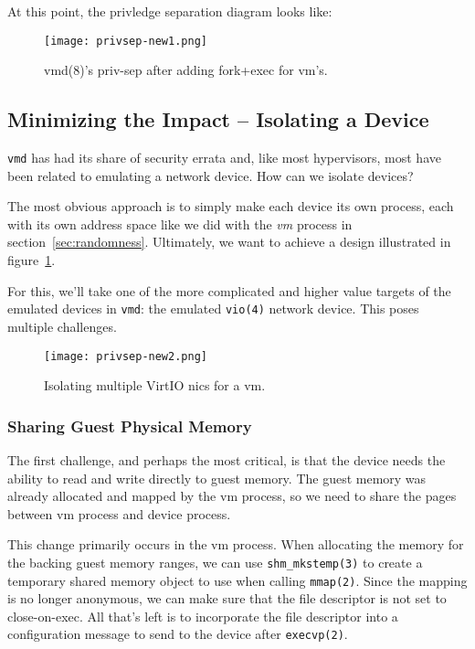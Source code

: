 \documentclass[conference]{IEEEtran}
\begin{document}
At this point, the privledge separation diagram looks like:

\begin{figure}
  \texttt{[image: privsep-new1.png]}
  \caption{vmd(8)'s priv-sep after adding fork+exec for vm's.}
\end{figure}


\vspace{3mm}
\subsection{Minimizing the Impact -- Isolating a Device}
\texttt{vmd} has had its share of security errata and, like most
hypervisors, most have been related to emulating a network device. How
can we isolate devices?

The most obvious approach is to simply make each device its own
process, each with its own address space like we did with the
\emph{vm} process in section~\ref{sec:randomness}. Ultimately, we want
to achieve a design illustrated in figure~\ref{fig:new2}.

For this, we'll take one of the more complicated and higher value
targets of the emulated devices in \texttt{vmd}: the emulated
\texttt{vio(4)} network device. This poses multiple challenges.

\begin{figure}
  \label{fig:new2}
  \texttt{[image: privsep-new2.png]}
  \caption{Isolating multiple VirtIO nics for a vm.}
\end{figure}


\vspace{2mm}
\subsubsection{Sharing Guest Physical Memory}
The first challenge, and perhaps the most critical, is that the device
needs the ability to read and write directly to guest memory. The
guest memory was already allocated and mapped by the vm process, so we
need to share the pages between vm process and device process.

This change primarily occurs in the vm process. When allocating the
memory for the backing guest memory ranges, we can use
\texttt{shm\_mkstemp(3)} to create a temporary shared memory object
to use when calling \texttt{mmap(2)}. Since the mapping is no longer
anonymous, we can make sure that the file descriptor is not set to
close-on-exec. All that's left is to incorporate the file descriptor
into a configuration message to send to the device after
\texttt{execvp(2)}.
\end{document}
